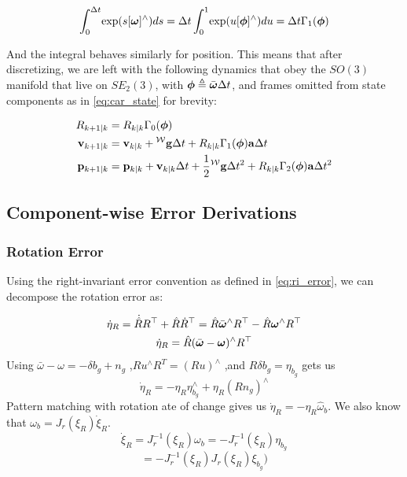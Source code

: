 \begin{equation}
  \int_0^{\Delta t}\! \exp(s[\boldsymbol{\omega}]^\wedge)ds = \Delta t \int_0^1\! \exp(u[\boldsymbol{\phi}]^\wedge)du = \Delta t \Gamma_1(\boldsymbol{\phi})
  \label{eq:vel_integration}
\end{equation}

And the integral behaves similarly for position. This means that after discretizing, we are left with the following dynamics that obey the $SO(3)$ manifold that live on $SE_2(3)$, with $\boldsymbol{\phi} \triangleq \bar{\boldsymbol{\omega}} \Delta t$, and frames omitted from state components as in \eqref{eq:car_state} for brevity:

\small{
\begin{equation}
  \begin{aligned}
    R_{k+1|k} &= R_{k|k}\Gamma_0(\boldsymbol{\phi}) \\
    \mathbf{v}_{k+1|k} &= \mathbf{v}_{k|k} + {}^\mathcal{W}\mathbf{g}\Delta t + R_{k|k}\Gamma_1(\boldsymbol{\phi})\mathbf{a}\Delta t \\
    \mathbf{p}_{k+1|k} &= \mathbf{p}_{k|k} + \mathbf{v}_{k|k}\Delta t + \frac{1}{2}{}^\mathcal{W}\mathbf{g}\Delta t^2 + R_{k|k}\Gamma_2(\boldsymbol{\phi})\mathbf{a}\Delta t^2 \\
  \end{aligned}
  \label{eq:dt_dynamics}
\end{equation}
}

\subsection{Component-wise Error Derivations}

\subsubsection{Rotation Error}
Using the right-invariant error convention as defined in \eqref{eq:ri_error}, we can decompose the rotation error as:

\begin{equation}
  \begin{gathered}
  \dot{\eta}_R = \dot{\hat{R}}R^\top + \hat{R}\dot{R}^\top = \hat{R}\bar{\boldsymbol{\omega}}^\wedge R^\top - \hat{R}\boldsymbol{\omega}^\wedge R^\top \\
  \dot{\eta}_R = \hat{R}(\bar{\boldsymbol{\omega}}-\boldsymbol{\omega})^\wedge R^\top
\end{gathered}
  \label{eq:rotation_error1}
\end{equation}
Using $\bar \omega -\omega  = -\delta b_g+n_g$ ,$Ru^\wedge R^T=(Ru)^\wedge$ ,and $R\delta b_g = \eta_{b_g}$ gets us 
\begin{equation}
  \dot \eta_R = -\eta_R \eta^\wedge_{b_g}+\eta_R(Rn_g)^\wedge
\end{equation}
Pattern matching with rotation ate of change gives us $\dot \eta_R = -\eta_R\hat \omega_{b}$. We also know that $\omega_b = J_r(\xi_R)\dot \xi_R$.\\
\begin{equation}
  \dot \xi_R = J^{-1}_r(\xi_R)\omega_b=-J_r^{-1}(\xi_R)\eta_{b_g}
\end{equation}
\begin{equation}
  =-J_r^{-1}(\xi_R)J_r(\xi_R)\xi_{b_g}
  )

\end{equation}
